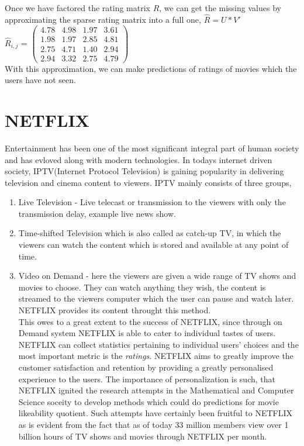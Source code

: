 \begin{example}
 Once we have factored the rating matrix $R$, we can get the missing values by
approximating the sparse rating matrix into a full one,  $\hat{R}=U*V'$ \\

$\hat{R}_{i,j}$ =
 $\begin{pmatrix}
  4.78 & 4.98 & 1.97 & 3.61 \\
  1.98 & 1.97 & 2.85 & 4.81 \\
  2.75 & 4.71 & 1.40 & 2.94  \\
  2.94 & 3.32 & 2.75 & 4.79
 \end{pmatrix} $\\
 
 With this approximation, we can make predictions of ratings of movies which the
users have not seen. 
 
\end{example}

\section{NETFLIX}
Entertainment has been one of the most significant integral part of human
society and has evloved along with modern technologies. In todays internet
driven society, IPTV(Internet Protocol Television) is gaining popularity in
delivering television and cinema content to viewers. IPTV mainly consists of
three groups, \\
\begin{enumerate}%
\item Live Television - Live telecast or transmission to the viewers with only
the transmission delay, example live news show.
\item Time-shifted Television which is also called as catch-up TV, in which the
viewers can watch the content which is stored and available at any point of
time. 
\item Video on Demand - here the viewers are given a wide range of TV shows and
movies to choose. They can watch anything they wish, the content is streamed to
the viewers computer which the user can pause and watch later. NETFLIX provides
its content throught this method. \\
This owes to a great extent to the success of NETFLIX, since through on Demand
system NETFLIX is able to cater to individual tastes of users. NETFLIX can
collect statistics pertaining to individual users' choices and the most
important metric is the \emph{ratings}. NETFLIX aims to greatly improve the
customer satisfaction and retention by providing a greatly personalised
experience to the users. The importance of personalization is such, that NETFLIX
ignited the research attempts in the Mathematical and Computer Science soceity
to develop methods which could do predictions for movie likeability quotient.
Such attempts have certainly been fruitful to NETFLIX as is evident from the
fact that as of today 33 million members view over 1 billion hours of TV shows
and movies through NETFLIX per month.
\end{enumerate}

